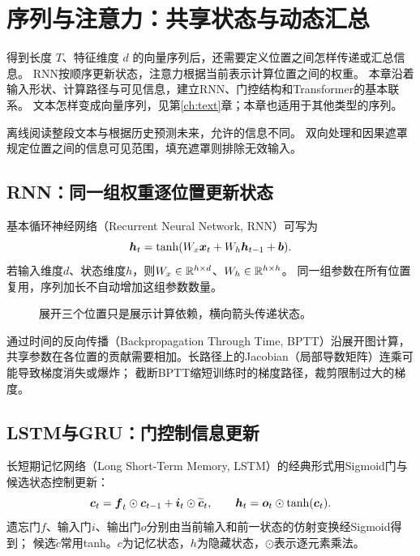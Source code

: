 \chapter{序列与注意力：共享状态与动态汇总}
\label{ch:sequence}

得到长度 $T$、特征维度 $d$ 的向量序列后，还需要定义位置之间怎样传递或汇总信息。
RNN按顺序更新状态，注意力根据当前表示计算位置之间的权重。
本章沿着输入形状、计算路径与可见信息，建立RNN、门控结构和Transformer的基本联系。
文本怎样变成向量序列，见第\ref{ch:text}章；本章也适用于其他类型的序列。

\begin{keyidea}
离线阅读整段文本与根据历史预测未来，允许的信息不同。
双向处理和因果遮罩规定位置之间的信息可见范围，填充遮罩则排除无效输入。
\end{keyidea}

\section{RNN：同一组权重逐位置更新状态}
\label{sec:seq-rnn}
基本循环神经网络（Recurrent Neural Network, RNN）可写为
\[
 \boldsymbol{h}_t=\tanh(W_x\boldsymbol{x}_t+W_h\boldsymbol{h}_{t-1}+\boldsymbol{b}).
\]
若输入维度$d$、状态维度$h$，则$W_x\in\mathbb{R}^{h\times d}$、$W_h\in\mathbb{R}^{h\times h}$。
同一组参数在所有位置复用，序列加长不自动增加这组参数数量。

\begin{figure}[htbp]
\centering
\caption{展开三个位置只是展示计算依赖，横向箭头传递状态。}
\par\smallskip
{}
\end{figure}

通过时间的反向传播（Backpropagation Through Time, BPTT）沿展开图计算，
共享参数在各位置的贡献需要相加。长路径上的Jacobian（局部导数矩阵）连乘可能导致梯度消失或爆炸；
截断BPTT缩短训练时的梯度路径，裁剪限制过大的梯度。


\section{LSTM与GRU：门控制信息更新}
\label{sec:seq-gates}
长短期记忆网络（Long Short-Term Memory, LSTM）的经典形式用Sigmoid门与候选状态控制更新：
\[
 \boldsymbol{c}_t=\boldsymbol{f}_t\odot\boldsymbol{c}_{t-1}+\boldsymbol{i}_t\odot\widetilde{\boldsymbol{c}}_t,
 \qquad\boldsymbol{h}_t=\boldsymbol{o}_t\odot\tanh(\boldsymbol{c}_t).
\]
遗忘门$f$、输入门$i$、输出门$o$分别由当前输入和前一状态的仿射变换经Sigmoid得到；
候选$\widetilde c$常用tanh。$c$为记忆状态，$h$为隐藏状态，$\odot$表示逐元素乘法。

